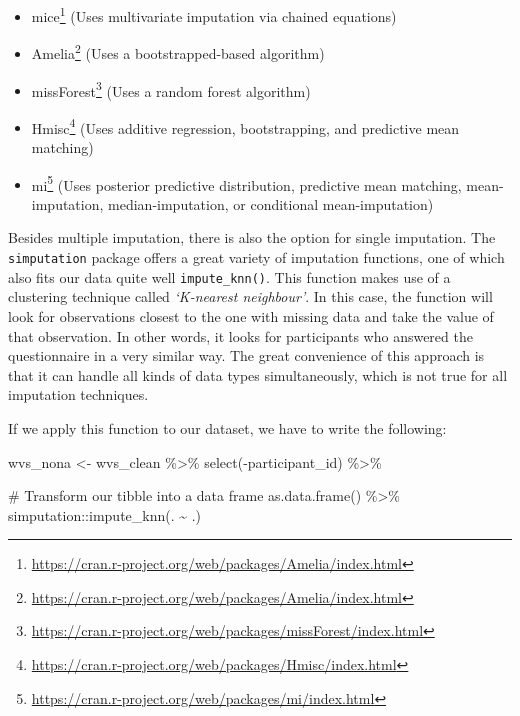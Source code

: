 \documentclass[
  letterpaper,
]{krantz}
\makeatletter
\newenvironment{Shaded}{\begin{snugshade}}{\end{snugshade}}
\newcommand{\CommentTok}[1]{\textcolor[rgb]{0.37,0.37,0.37}{#1}}
\newcommand{\FunctionTok}[1]{\textcolor[rgb]{0.28,0.35,0.67}{#1}}
\newcommand{\NormalTok}[1]{\textcolor[rgb]{0.00,0.23,0.31}{#1}}
\newcommand{\OtherTok}[1]{\textcolor[rgb]{0.00,0.23,0.31}{#1}}
\newcommand{\SpecialCharTok}[1]{\textcolor[rgb]{0.37,0.37,0.37}{#1}}
\renewcommand{\href}[2]{#2\footnote{\url{#1}}}
\newenvironment{kframe}{%
\medskip{}
\setlength{\fboxsep}{.8em}
 \def\at@end@of@kframe{}%
 \ifinner\ifhmode%
  \def\at@end@of@kframe{\end{minipage}}%
  \begin{minipage}{\columnwidth}%
 \fi\fi%
 \def\FrameCommand##1{\hskip\@totalleftmargin \hskip-\fboxsep
 \colorbox{shadecolor}{##1}\hskip-\fboxsep
     \hskip-\linewidth \hskip-\@totalleftmargin \hskip\columnwidth}%
 \MakeFramed {\advance\hsize-\width
   \@totalleftmargin\z@ \linewidth\hsize
   \@setminipage}}%
 {\par\unskip\endMakeFramed%
 \at@end@of@kframe}
\renewenvironment{Shaded}{\begin{kframe}}{\end{kframe}}
\makeatother
\begin{document}
\begin{itemize}
\item
  \href{https://cran.r-project.org/web/packages/Amelia/index.html}{mice}
  (Uses multivariate imputation via chained equations)
\item
  \href{https://cran.r-project.org/web/packages/Amelia/index.html}{Amelia}
  (Uses a bootstrapped-based algorithm)
\item
  \href{https://cran.r-project.org/web/packages/missForest/index.html}{missForest}
  (Uses a random forest algorithm)
\item
  \href{https://cran.r-project.org/web/packages/Hmisc/index.html}{Hmisc}
  (Uses additive regression, bootstrapping, and predictive mean
  matching)
\item
  \href{https://cran.r-project.org/web/packages/mi/index.html}{mi} (Uses
  posterior predictive distribution, predictive mean matching,
  mean-imputation, median-imputation, or conditional mean-imputation)
\end{itemize}

Besides multiple imputation, there is also the option for single
imputation. The \texttt{simputation} package offers a great variety of
imputation functions, one of which also fits our data quite well
\texttt{impute\_knn()}. This function makes use of a clustering
technique called \emph{`K-nearest neighbour'}. In this case, the
function will look for observations closest to the one with missing data
and take the value of that observation. In other words, it looks for
participants who answered the questionnaire in a very similar way. The
great convenience of this approach is that it can handle all kinds of
data types simultaneously, which is not true for all imputation
techniques.

If we apply this function to our dataset, we have to write the
following:

\begin{Shaded}
\begin{Highlighting}[]
\NormalTok{wvs\_nona }\OtherTok{\textless{}{-}}
\NormalTok{  wvs\_clean }\SpecialCharTok{\%\textgreater{}\%}
  \FunctionTok{select}\NormalTok{(}\SpecialCharTok{{-}}\NormalTok{participant\_id) }\SpecialCharTok{\%\textgreater{}\%}
  
  \CommentTok{\# Transform our tibble into a data frame}
  \FunctionTok{as.data.frame}\NormalTok{() }\SpecialCharTok{\%\textgreater{}\%}
\NormalTok{  simputation}\SpecialCharTok{::}\FunctionTok{impute\_knn}\NormalTok{(. }\SpecialCharTok{\textasciitilde{}}\NormalTok{ .)}
\end{Highlighting}
\end{Shaded}
\end{document}
